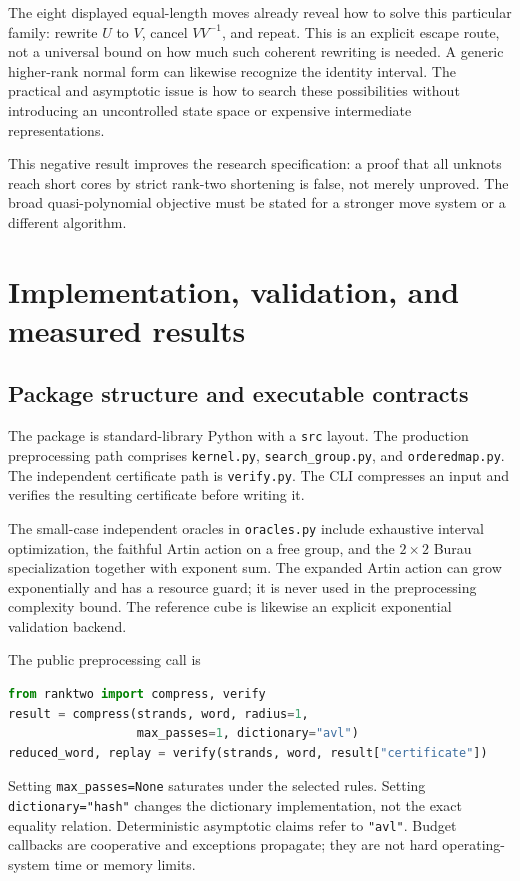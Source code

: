 \documentclass[11pt]{article}
\theoremstyle{definition}
\theoremstyle{remark}
\begin{document}
The eight displayed equal-length moves already reveal how to solve this
particular family: rewrite $U$ to $V$, cancel $VV^{-1}$, and repeat. This is
an explicit escape route, not a universal bound on how much such coherent
rewriting is needed. A generic higher-rank normal form can likewise
recognize the identity interval. The practical and asymptotic issue is how
to search these possibilities without introducing an uncontrolled state
space or expensive intermediate representations.

This negative result improves the research specification: a proof that
all unknots reach short cores by strict rank-two shortening is false,
not merely unproved. The broad quasi-polynomial objective must be stated
for a stronger move system or a different algorithm.

\section{Implementation, validation, and measured results}
\subsection{Package structure and executable contracts}
The package is standard-library Python with a \texttt{src} layout.
The production preprocessing path comprises \texttt{kernel.py},
\texttt{search\_group.py}, and \texttt{orderedmap.py}. The independent
certificate path is \texttt{verify.py}. The CLI compresses an input and
verifies the resulting certificate before writing it.

The small-case independent oracles in \texttt{oracles.py} include exhaustive
interval optimization, the faithful Artin action on a free group, and the
$2\times2$ Burau specialization together with exponent sum. The expanded
Artin action can grow exponentially and has a resource guard; it is never
used in the preprocessing complexity bound. The reference cube is likewise
an explicit exponential validation backend.

The public preprocessing call is
\begin{lstlisting}[language=Python]
from ranktwo import compress, verify
result = compress(strands, word, radius=1,
                  max_passes=1, dictionary="avl")
reduced_word, replay = verify(strands, word, result["certificate"])
\end{lstlisting}
Setting \texttt{max\_passes=None} saturates under the selected rules.
Setting \texttt{dictionary="hash"} changes the dictionary implementation,
not the exact equality relation. Deterministic asymptotic claims refer to
\texttt{"avl"}. Budget callbacks are cooperative and exceptions propagate;
they are not hard operating-system time or memory limits.
\end{document}

